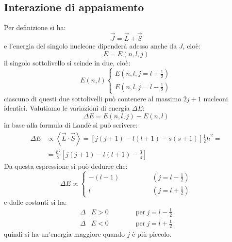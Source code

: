 \subsection{Interazione di appaiamento}
Per  definizione si ha: 
\begin{equation}
\vec{J} = \vec{L} + \vec{S}
\end{equation}
e l'energia del singolo nucleone dipenderà adesso anche da $J$, cioè:
\begin{equation}
E = E{(n, l, j)}
\end{equation}
il singolo sottolivello si scinde in due, cioè:
\begin{equation}
E{(n,l)} \begin{cases}
E{(n, l, j = l + \frac{1}{2})}\\
E{(n, l, j = l - \frac{1}{2})}
\end{cases}
\end{equation}
ciascuno di questi due sottolivelli può contenere al massimo $2j + 1$ nucleoni 
identici. Valutiamo le variazioni di energia $\Delta E$:
\begin{equation}
\Delta E = E{(n, l, j)} - E{(n,l)}
\end{equation}
in base alla formula di Landè si può scrivere:
\begin{equation}
\begin{split}
\Delta E &\propto \left\langle \vec{L} \cdot \vec{S} \right\rangle = \left[ 
j(j+1) - l(l+1) - s(s+1) \right] \frac{1}{2} \hbar^2 =\\
&= \frac{\hbar ^2}{2} \left[  j(j+1) - l(l+1) - \frac{3}{4} \right]
\end{split}
\end{equation}
Da questa espressione si può dedurre che:
\begin{equation}
\Delta E \propto \begin{cases}
-(l-1) \qquad \qquad &(j = l - \frac{1}{2})\\
l \qquad &(j = l + \frac{1}{2})
\end{cases}
\end{equation}
e dalle costanti si ha:
\begin{equation}
\begin{split}
\Delta &E > 0 \qquad \qquad \text{per}\ j = l - \frac{1}{2}\\
\Delta &E < 0 \qquad \qquad \text{per}\ j = l + \frac{1}{2}
\end{split}
\end{equation}
quindi si ha un'energia maggiore quando $j$ è più piccolo.

